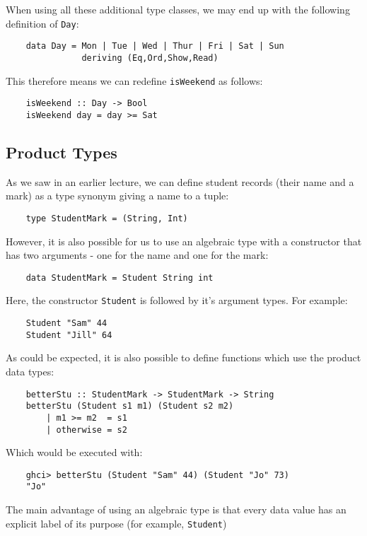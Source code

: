 When using all these additional type classes, we may end up with the following definition of \verb|Day|:
\begin{verbatim}
    data Day = Mon | Tue | Wed | Thur | Fri | Sat | Sun
               deriving (Eq,Ord,Show,Read)
\end{verbatim}

This therefore means we can redefine \verb|isWeekend| as follows:
\begin{verbatim}
    isWeekend :: Day -> Bool
    isWeekend day = day >= Sat
\end{verbatim}

\subsection{Product Types}
As we saw in an earlier lecture, we can define student records (their name and a mark) as a type synonym giving a name to a tuple:
\begin{verbatim}
    type StudentMark = (String, Int)
\end{verbatim}
However, it is also possible for us to use an algebraic type with a constructor that has two arguments - one for the name and one for the mark:
\begin{verbatim}
    data StudentMark = Student String int
\end{verbatim}
Here, the constructor \verb|Student| is followed by it's argument types. For example:
\begin{verbatim}
    Student "Sam" 44
    Student "Jill" 64
\end{verbatim}

As could be expected, it is also possible to define functions which use the product data types:
\begin{verbatim}
    betterStu :: StudentMark -> StudentMark -> String
    betterStu (Student s1 m1) (Student s2 m2)
        | m1 >= m2  = s1
        | otherwise = s2
\end{verbatim}

Which would be executed with:
\begin{verbatim}
    ghci> betterStu (Student "Sam" 44) (Student "Jo" 73)
    "Jo"
\end{verbatim}

The main advantage of using an algebraic type is that every data value has an explicit label of its purpose (for example, \verb|Student|)


